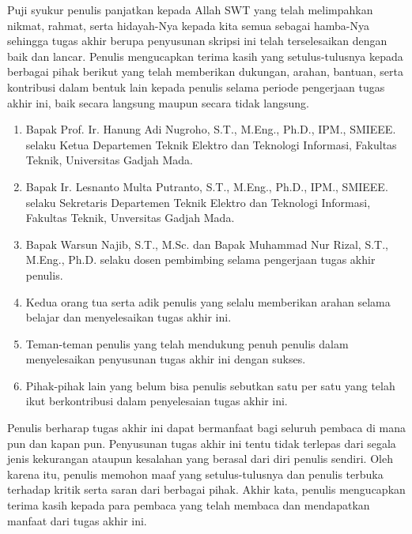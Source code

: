 Puji syukur penulis panjatkan kepada Allah SWT yang telah melimpahkan nikmat, rahmat, serta hidayah-Nya kepada kita semua sebagai hamba-Nya sehingga tugas akhir berupa penyusunan skripsi ini telah terselesaikan dengan baik dan lancar. Penulis mengucapkan terima kasih yang setulus-tulusnya kepada berbagai pihak berikut yang telah memberikan dukungan, arahan, bantuan, serta kontribusi dalam bentuk lain kepada penulis selama periode pengerjaan tugas akhir ini, baik secara langsung maupun secara tidak langsung.

\begin{enumerate}
	\item Bapak Prof. Ir. Hanung Adi Nugroho, S.T., M.Eng., Ph.D., IPM., SMIEEE. selaku Ketua Departemen Teknik Elektro dan Teknologi Informasi, Fakultas Teknik, Universitas Gadjah Mada.
 
	\item Bapak Ir. Lesnanto Multa Putranto, S.T., M.Eng., Ph.D., IPM., SMIEEE. selaku Sekretaris Departemen Teknik Elektro dan Teknologi Informasi, Fakultas Teknik, Unversitas Gadjah Mada.
 
        \item Bapak Warsun Najib, S.T., M.Sc. dan Bapak Muhammad Nur Rizal, S.T., M.Eng., Ph.D. selaku dosen pembimbing selama pengerjaan tugas akhir penulis.
	
	\item Kedua orang tua serta adik penulis yang selalu memberikan arahan selama belajar dan menyelesaikan tugas akhir ini.

        \item Teman-teman penulis yang telah mendukung penuh penulis dalam menyelesaikan penyusunan tugas akhir ini dengan sukses.

        \item Pihak-pihak lain yang belum bisa penulis sebutkan satu per satu yang telah ikut berkontribusi dalam penyelesaian tugas akhir ini.
\end{enumerate}

Penulis berharap tugas akhir ini dapat bermanfaat bagi seluruh pembaca di mana pun dan kapan pun. Penyusunan tugas akhir ini tentu tidak terlepas dari segala jenis kekurangan ataupun kesalahan yang berasal dari diri penulis sendiri. Oleh karena itu, penulis memohon maaf yang setulus-tulusnya dan penulis terbuka terhadap kritik serta saran dari berbagai pihak. Akhir kata, penulis mengucapkan terima kasih kepada para pembaca yang telah membaca dan mendapatkan manfaat dari tugas akhir ini.
